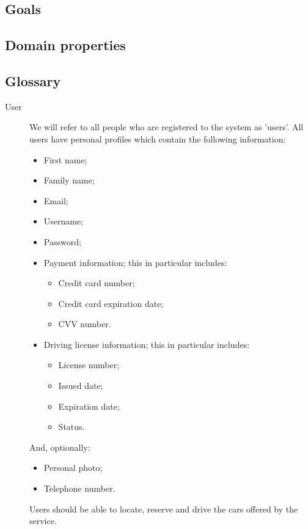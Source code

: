 \documentclass{article}
\begin{document}
		\subsection{Goals}
		

		\subsection{Domain properties}
		

		\subsection{Glossary}
			\begin{description}
				\item[User] We will refer to all people who are registered to the system as 'users'. All users have personal profiles which contain the following information:
				\begin{itemize}
					\item First name;
					\item Family name; %
					\item Email;
					\item Username;
					\item Password;
					\item Payment information; this in particular includes:
						\begin{itemize}
							\item Credit card number;
							\item Credit card expiration date;
							\item CVV number.
						\end{itemize}
					\item Driving license information; this in particular includes:
						\begin{itemize}
							\item License number;
							\item Issued date;
							\item Expiration date;
							\item Status. %
						\end{itemize}
				\end{itemize}
				And, optionally:
				\begin{itemize}		
					\item Personal photo;
					\item Telephone number. %
				\end{itemize}
				Users should be able to locate, reserve and drive the cars offered by the service. %
				

\end{description}
\end{document}
